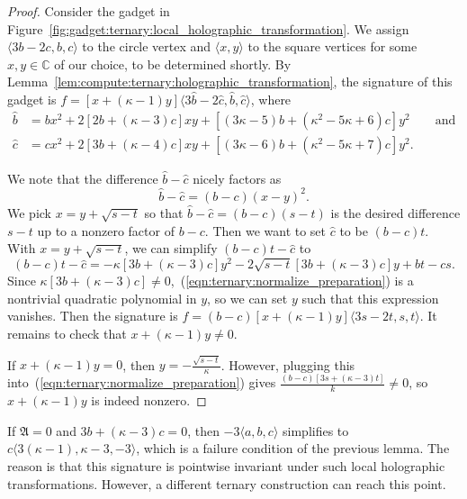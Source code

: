 \documentclass[11pt]{article}
\begin{document}
\begin{proof}
 Consider the gadget in Figure~\ref{fig:gadget:ternary:local_holographic_transformation}.
 We assign $\langle 3 b - 2 c, b, c \rangle$ to the circle vertex and $\langle x,y \rangle$ to the square vertices for some $x,y \in \mathbb{C}$ of our choice,
 to be determined shortly.
 By Lemma~\ref{lem:compute:ternary:holographic_transformation},
 the signature of this gadget is $f = [x + (\kappa - 1) y] \langle 3 \hat{b} - 2 \hat{c}, \hat{b}, \hat{c} \rangle$,
 where
 \begin{align*}
  \hat{b} &=   b x^2
        + 2 [2 b + (\kappa - 3) c] x y
        + [(3 \kappa - 5) b + (\kappa^2 - 5 \kappa + 6) c] y^2
        \qquad \text{and}\\
  \hat{c} &=   c x^2
        + 2 [3 b + (\kappa - 4) c] x y
        + [(3 \kappa - 6) b + (\kappa^2 - 5 \kappa + 7) c] y^2.
 \end{align*}
 
 We note that the difference $\hat{b} - \hat{c}$ nicely factors as
 \[
  \hat{b} - \hat{c} = (b - c) (x - y)^2.
 \]
 We pick $x = y + \sqrt{s - t}$ so that $\hat{b} - \hat{c} = (b - c) (s - t)$ is the desired difference $s - t$ up to a nonzero factor of $b - c$.
 Then we want to set $\hat{c}$ to be $(b - c) t$.
 With $x = y + \sqrt{s - t}$,
 we can simplify $(b - c) t - \hat{c}$ to
 \begin{equation} \label{eqn:ternary:normalize_preparation}
  (b - c) t - \hat{c}
  = -\kappa [3 b + (\kappa - 3) c] y^2 - 2 \sqrt{s-t} [3 b + (\kappa - 3) c] y + b t - c s.
 \end{equation}
 Since $\kappa [3 b + (\kappa - 3) c] \ne 0$,~(\ref{eqn:ternary:normalize_preparation}) is a nontrivial quadratic polynomial in $y$,
 so we can set $y$ such that this expression vanishes.
 Then the signature is $f = (b - c) [x + (\kappa - 1) y] \langle 3 s - 2 t, s, t \rangle$.
 It remains to check that $x + (\kappa - 1) y \ne 0$.
 
 If $x + (\kappa - 1) y = 0$,
 then $y = -\frac{\sqrt{s-t}}{\kappa}$.
 However, plugging this into~(\ref{eqn:ternary:normalize_preparation}) gives $\frac{(b-c) [3 s + (\kappa - 3) t]}{k} \ne 0$,
 so $x + (\kappa - 1) y$ is indeed nonzero.
\end{proof}

If $\mathfrak{A} = 0$ and $3 b + (\kappa - 3) c = 0$,
then $-3 \langle a,b,c \rangle$ simplifies to $c \langle 3 (\kappa - 1), \kappa - 3, -3 \rangle$,
which is a failure condition of the previous lemma.
The reason is that this signature is pointwise invariant under such local holographic transformations.
However, a different ternary construction can reach this point.
\end{document}
